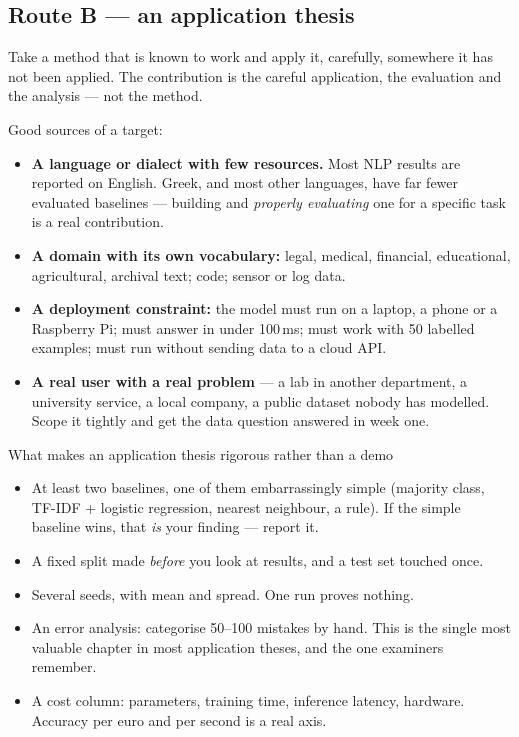 \documentclass[11pt,a4paper]{article}
\begin{document}
\subsection{Route B --- an application thesis}

Take a method that is known to work and apply it, carefully, somewhere it has
not been applied. The contribution is the careful application, the evaluation
and the analysis --- not the method.

Good sources of a target:

\begin{itemize}
  \item \textbf{A language or dialect with few resources.} Most NLP results
        are reported on English. Greek, and most other languages, have far
        fewer evaluated baselines --- building and \emph{properly evaluating}
        one for a specific task is a real contribution.
  \item \textbf{A domain with its own vocabulary:} legal, medical, financial,
        educational, agricultural, archival text; code; sensor or log data.
  \item \textbf{A deployment constraint:} the model must run on a laptop, a
        phone or a Raspberry Pi; must answer in under 100\,ms; must work with
        50 labelled examples; must run without sending data to a cloud API.
  \item \textbf{A real user with a real problem} --- a lab in another
        department, a university service, a local company, a public dataset
        nobody has modelled. Scope it tightly and get the data question
        answered in week one.
\end{itemize}

\begin{cbox}{What makes an application thesis rigorous rather than a demo}
\begin{itemize}
  \item At least two baselines, one of them embarrassingly simple (majority
        class, TF-IDF + logistic regression, nearest neighbour, a rule). If
        the simple baseline wins, that \emph{is} your finding --- report it.
  \item A fixed split made \emph{before} you look at results, and a test set
        touched once.
  \item Several seeds, with mean and spread. One run proves nothing.
  \item An error analysis: categorise 50--100 mistakes by hand. This is the
        single most valuable chapter in most application theses, and the one
        examiners remember.
  \item A cost column: parameters, training time, inference latency, hardware.
        Accuracy per euro and per second is a real axis.
\end{itemize}
\end{cbox}
\end{document}
